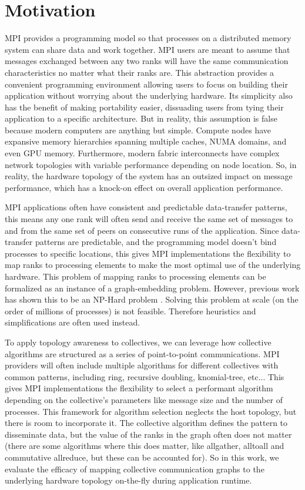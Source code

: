 \section{Motivation}
MPI provides a programming model so that processes on a distributed memory system can share data and work together.
MPI users are meant to assume that messages exchanged between any two ranks will have the same communication characteristics no matter what their ranks are. 
This abstraction provides a convenient programming environment allowing users to focus on building their application without worrying about the underlying hardware. 
Its simplicity also has the benefit of making portability easier, dissuading users from tying their application to a specific architecture.
But in reality, this assumption is false because modern computers are anything but simple. 
Compute nodes have expansive memory hierarchies spanning multiple caches, NUMA domains, and even GPU memory.
Furthermore, modern fabric interconnects have complex network topologies with variable performance depending on node location.
So, in reality, the hardware topology of the system has an outsized impact on message performance, which has a knock-on effect on overall application performance. 

MPI applications often have consistent and predictable data-transfer patterns, this means any one rank will often send and receive the same set of messages to and from the same set of peers on consecutive runs of the application.
Since data-transfer patterns are predictable, and the programming model doesn't bind processes to specific locations, this gives MPI implementations the flexibility to map ranks to processing elements to make the most optimal use of the underlying hardware.
This problem of mapping ranks to processing elements can be formalized as an instance of a graph-embedding problem. However, previous work has shown this to be an NP-Hard problem \cite{Hoefler2011GenericTopoMappingStrats}. 
Solving this problem at scale (on the order of millions of processes) is not feasible. Therefore heuristics and simplifications are often used instead.

To apply topology awareness to collectives, we can leverage how collective algorithms are structured as a series of point-to-point communications.
MPI providers will often include multiple algorithms for different collectives with common patterns, including ring, recursive doubling, knomial-tree, etc...
This gives MPI implementations the flexibility to select a performant algorithm depending on the collective's parameters like message size and the number of processes.
This framework for algorithm selection neglects the host topology, but there is room to incorporate it.
The collective algorithm defines the pattern to disseminate data, but the value of the ranks in the graph often does not matter (there are some algorithms where this does matter, like allgather, alltoall and commutative allreduce, but these can be accounted for).
So in this work, we evaluate the efficacy of mapping collective communication graphs to the underlying hardware topology on-the-fly during application runtime.

